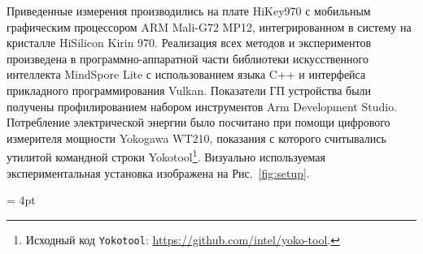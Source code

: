 Приведенные измерения производились на плате HiKey970 с мобильным графическим
процессором ARM Mali-G72 MP12, интегрированном в систему на кристалле HiSilicon
Kirin 970. Реализация всех методов и экспериментов произведена в
программно-аппаратной части библиотеки искусственного интеллекта MindSpore Lite
с использованием языка C++ и интерфейса прикладного программирования Vulkan.
Показатели ГП устройства были получены профилированием набором инструментов Arm
Development Studio. Потребление электрической энергии было посчитано при помощи
цифрового измерителя мощности Yokogawa WT210, показания с которого считывались
утилитой командной строки Yokotool\footnote{Исходный код \texttt{Yokotool}:
\url{https://github.com/intel/yoko-tool}.}. Визуально используемая
экспериментальная установка изображена на Рис.~\ref{fig:setup}.

\tabulinesep = 4pt

